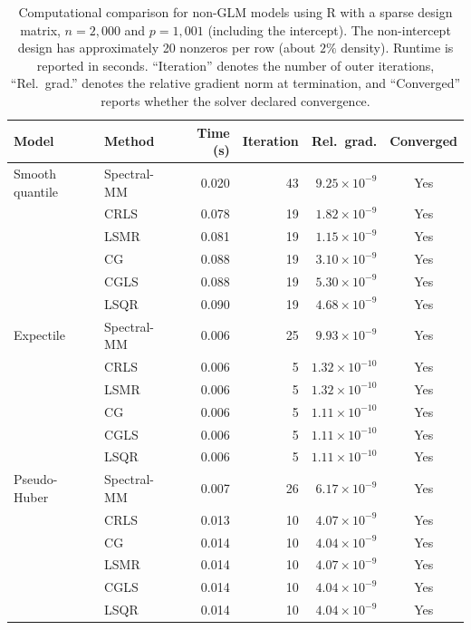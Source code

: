 \begin{table}[htbp]
\centering
\small
\setlength{\tabcolsep}{4pt}
\caption{
Computational comparison for non-GLM models using R with a sparse design matrix,
$n=2{,}000$ and $p=1{,}001$ (including the intercept).
The non-intercept design has approximately 20 nonzeros per row (about $2\%$ density).
Runtime is reported in seconds. ``Iteration\textquotedblright{} denotes the number of outer iterations,
``Rel.\ grad.\textquotedblright{} denotes the relative gradient norm at termination, and
``Converged\textquotedblright{} reports whether the solver declared convergence.}
\label{tab:r-nonglm-comparison-sparse}
\begin{tabular}{llrrrc}
\toprule
Model & Method & Time (s) & Iteration & Rel.\ grad. & Converged \\
\midrule

Smooth quantile
& Spectral-MM & 0.020 & 43 & $9.25\times10^{-9}$ & Yes \\
& CRLS & 0.078 & 19 & $1.82\times10^{-9}$ & Yes \\
& LSMR & 0.081 & 19 & $1.15\times10^{-9}$ & Yes \\
& CG & 0.088 & 19 & $3.10\times10^{-9}$ & Yes \\
& CGLS & 0.088 & 19 & $5.30\times10^{-9}$ & Yes \\
& LSQR & 0.090 & 19 & $4.68\times10^{-9}$ & Yes \\
\midrule

Expectile
& Spectral-MM & 0.006 & 25 & $9.93\times10^{-9}$ & Yes \\
& CRLS & 0.006 & 5 & $1.32\times10^{-10}$ & Yes \\
& LSMR & 0.006 & 5 & $1.32\times10^{-10}$ & Yes \\
& CG & 0.006 & 5 & $1.11\times10^{-10}$ & Yes \\
& CGLS & 0.006 & 5 & $1.11\times10^{-10}$ & Yes \\
& LSQR & 0.006 & 5 & $1.11\times10^{-10}$ & Yes \\
\midrule

Pseudo-Huber
& Spectral-MM & 0.007 & 26 & $6.17\times10^{-9}$ & Yes \\
& CRLS & 0.013 & 10 & $4.07\times10^{-9}$ & Yes \\
& CG & 0.014 & 10 & $4.04\times10^{-9}$ & Yes \\
& LSMR & 0.014 & 10 & $4.07\times10^{-9}$ & Yes \\
& CGLS & 0.014 & 10 & $4.04\times10^{-9}$ & Yes \\
& LSQR & 0.014 & 10 & $4.04\times10^{-9}$ & Yes \\
\midrule


\end{tabular}
\end{table}
